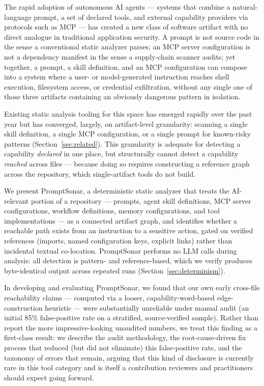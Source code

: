 \documentclass[sigconf,anonymous,review]{acmart}
\newcommand{\sysname}{PromptSonar}
\begin{document}
The rapid adoption of autonomous AI agents --- systems that combine a natural-language prompt, a set of declared tools, and external capability providers via protocols such as MCP --- has created a new class of software artifact with no direct analogue in traditional application security. A prompt is not source code in the sense a conventional static analyzer parses; an MCP server configuration is not a dependency manifest in the sense a supply-chain scanner audits; yet together, a prompt, a skill definition, and an MCP configuration can compose into a system where a user- or model-generated instruction reaches shell execution, filesystem access, or credential exfiltration, without any single one of those three artifacts containing an obviously dangerous pattern in isolation.

Existing static analysis tooling for this space has emerged rapidly over the past year but has converged, largely, on artifact-level granularity: scanning a single skill definition, a single MCP configuration, or a single prompt for known-risky patterns (Section~\ref{sec:related}). This granularity is adequate for detecting a capability \emph{declared} in one place, but structurally cannot detect a capability \emph{reached} across files --- because doing so requires constructing a reference graph across the repository, which single-artifact tools do not build.

We present \sysname{}, a deterministic static analyzer that treats the AI-relevant portion of a repository --- prompts, agent skill definitions, MCP server configurations, workflow definitions, memory configurations, and tool implementations --- as a connected artifact graph, and identifies whether a reachable path exists from an instruction to a sensitive action, gated on verified references (imports, named configuration keys, explicit links) rather than incidental textual co-location. \sysname{} performs no LLM calls during analysis: all detection is pattern- and reference-based, which we verify produces byte-identical output across repeated runs (Section~\ref{sec:determinism}).

In developing and evaluating \sysname{}, we found that our own early cross-file reachability claims --- computed via a looser, capability-word-based edge-construction heuristic --- were substantially unreliable under manual audit (an initial 85\% false-positive rate on a stratified, source-verified sample). Rather than report the more impressive-looking unaudited numbers, we treat this finding as a first-class result: we describe the audit methodology, the root-cause-driven fix process that reduced (but did not eliminate) this false-positive rate, and the taxonomy of errors that remain, arguing that this kind of disclosure is currently rare in this tool category and is itself a contribution reviewers and practitioners should expect going forward.
\end{document}
